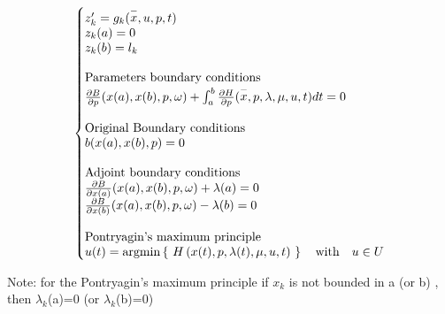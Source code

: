 \documentclass[a4paper,12pt]{article}
\makeatletter
\newenvironment{sistema}%
{\left\lbrace\begin{array}{@{}l@{}}}%
	{\end{array}\right.}
\makeatother
\begin{document}
\begin{enumerate}
\begin{gather}
\begin{sistema}
				z'_k=g_k(\stackrel{-}{x},u,p,t)\\
				z_k(a)=0\\
				z_k(b)=l_k\\ \\
				\text{Parameters boundary conditions}\\ 
				\frac{\partial B}{\partial p}(x(a),x(b),p,\omega)+\int_{a}^{b}\frac{\partial H}{\partial p }(\stackrel{-}{x},p,\lambda,\mu,u,t)dt=0\\ \\
				\text{Original Boundary conditions}\\
				b(x(a),x(b),p)=0\\ \\
				\text{Adjoint boundary conditions}\\
				\frac{\partial B}{\partial x(a)}(x(a),x(b),p,\omega)+\lambda(a)=0\\
				\frac{\partial B}{\partial x(b)}(x(a),x(b),p,\omega)-\lambda(b)=0\\ \\
				\text{Pontryagin's maximum principle}\\
				u(t)=\text{argmin}\left\{ \ H \left(x(t),p,\lambda(t),\mu,u,t \right) \ \right\} \ \ \ \text{with} \ \ \ u \in U
			\end{sistema}
		\end{gather}
		
		Note: for the Pontryagin's maximum principle if $x_k$ is not bounded in a (or b) , then $\lambda_k$(a)=0 (or $\lambda_k$(b)=0)
	\end{enumerate}
	
\end{document}
